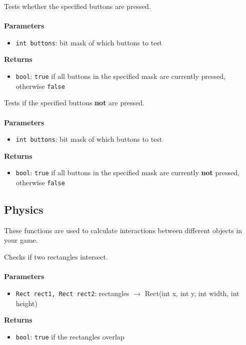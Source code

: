 \documentclass[11pt,fleqn]{book} %
\begin{document}
\begin{libf}
	Tests whether the specified buttons are pressed.\\ \\
	\textbf{Parameters}
	\begin{itemize}
		\item \texttt{int buttons}: bit mask of which buttons to test
	\end{itemize}
	\textbf{Returns}
	\begin{itemize}
		\item \texttt{bool}: \texttt{true} if all buttons in the specified mask are currently pressed, otherwise \texttt{false}
	\end{itemize}
\end{libf}

\begin{libf}
	Tests if the specified buttons \textbf{not} are pressed.\\ \\
	\textbf{Parameters}
	\begin{itemize}
		\item \texttt{int buttons}: bit mask of which buttons to test
	\end{itemize}
	\textbf{Returns}
	\begin{itemize}
		\item \texttt{bool}: \texttt{true} if all buttons in the specified mask are currently \textbf{not} pressed, otherwise \texttt{false}
	\end{itemize}
\end{libf}

\newpage

\subsection{Physics}
These functions are used to calculate interactions between different objects in your game.

\begin{libf}
	Checks if two rectangles intersect.\\ \\
	\textbf{Parameters}
	\begin{itemize}
		\item \texttt{Rect rect1, Rect rect2}: rectangles $\rightarrow$ Rect(int x, int y, int width, int height)
	\end{itemize}
	\textbf{Returns}
	\begin{itemize}
		\item \texttt{bool}: \texttt{true} if the rectangles overlap
	\end{itemize}
\end{libf}
\end{document}
